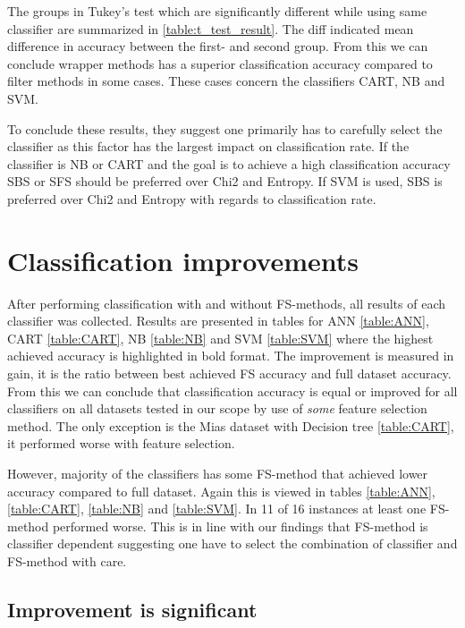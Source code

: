 The groups in Tukey's test which are significantly different while using same classifier are summarized in \ref{table:t_test_result}. The diff indicated mean difference in accuracy between the first- and second group. From this we can conclude wrapper methods has a superior classification accuracy compared to filter methods in some cases. These cases concern the classifiers CART, NB and SVM.



To conclude these results, they suggest one primarily has to carefully select the classifier as this factor has the largest impact on classification rate. If the classifier is NB or CART and the goal is to achieve a high classification accuracy SBS or SFS should be preferred over Chi2 and Entropy. If SVM is used, SBS is preferred over Chi2 and Entropy with regards to classification rate.

\section{Classification improvements}

After performing classification with and without FS-methods, all results of each classifier was collected. Results are presented in tables for ANN \ref{table:ANN}, CART \ref{table:CART}, NB \ref{table:NB} and SVM \ref{table:SVM} where the highest achieved accuracy is highlighted in bold format. The improvement is measured in gain, it is the ratio between best achieved FS accuracy and full dataset accuracy. From this we can conclude that classification accuracy is equal or improved for all classifiers on all datasets tested in our scope by use of \textit{some} feature selection method. The only exception is the Mias dataset with Decision tree \ref{table:CART}, it performed worse with feature selection.

However, majority of the classifiers has some FS-method that achieved lower accuracy compared to full dataset. Again this is viewed in tables \ref{table:ANN}, \ref{table:CART}, \ref{table:NB} and \ref{table:SVM}. In 11 of 16 instances at least one FS-method performed worse. This is in line with our findings that FS-method is classifier dependent suggesting one have to select the combination of classifier and FS-method with care.



\subsection{Improvement is significant}

